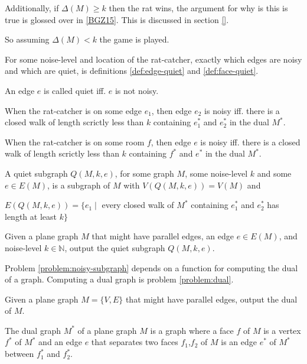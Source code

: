 \documentclass{article}
\begin{document}
	Additionally, if $\Delta(M) \geq k$ then the rat wins, the argument for why is this is true is glossed over in \ref{BGZ15}. This is discussed in section \ref{}.

	So assuming $\Delta(M) < k$ the game is played.

	For some noise-level and location of the rat-catcher, exactly which edges are noisy and which are quiet, is definitions \ref{def:edge-quiet} and \ref{def:face-quiet}.

	An edge $e$ is called quiet iff. $e$ is not noisy.

	\begin{definition}\label{def:edge-quiet}
		When the rat-catcher is on some edge $e_1$, then edge $e_2$ is noisy iff. there is a closed walk of length scrictly less than $k$ containing $e_1^*$ and $e_2^*$ in the dual $M^*$.
	\end{definition}

	\begin{definition}\label{def:face-quiet}
		When the rat-catcher is on some room $f$, then edge $e$ is noisy iff. there is a closed walk of length scrictly less than $k$ containing $f^*$ and $e^*$ in the dual $M^*$.
	\end{definition}

	A quiet subgraph $Q(M, k, e)$, for some graph $M$, some noise-level $k$ and some $e \in E(M)$, is a subgraph of $M$ with $V(Q(M, k, e)) = V(M)$ and

	$E(Q(M, k, e)) = \{e_1 \mid$ every closed walk of $M^*$ containing $e_1^*$ and $e_2^*$ has length at least $k\}$

	\begin{problem}\label{problem:noisy-subgraph}
		Given a plane graph $M$ that might have parallel edges, an edge $e \in E(M)$, and noise-level $k \in \mathbb{N}$, output the quiet subgraph $Q(M, k, e)$.
	\end{problem}

	Problem \ref{problem:noisy-subgraph} depends on a function for computing the dual of a graph. Computing a dual graph is problem \ref{problem:dual}.

	\begin{problem}\label{problem:dual}
		Given a plane graph $M = \{V, E\}$ that might have parallel edges, output the dual of $M$.
	\end{problem}

	\begin{definition}
		The dual graph $M^*$ of a plane graph $M$ is a graph where a face $f$ of $M$ is a vertex $f^*$ of $M^*$ and an edge $e$ that separates two faces $f_1$,$f_2$ of $M$ is an edge $e^*$ of $M^*$ between $f_1^*$ and $f_2^*$.
	\end{definition}
	
\end{document}
